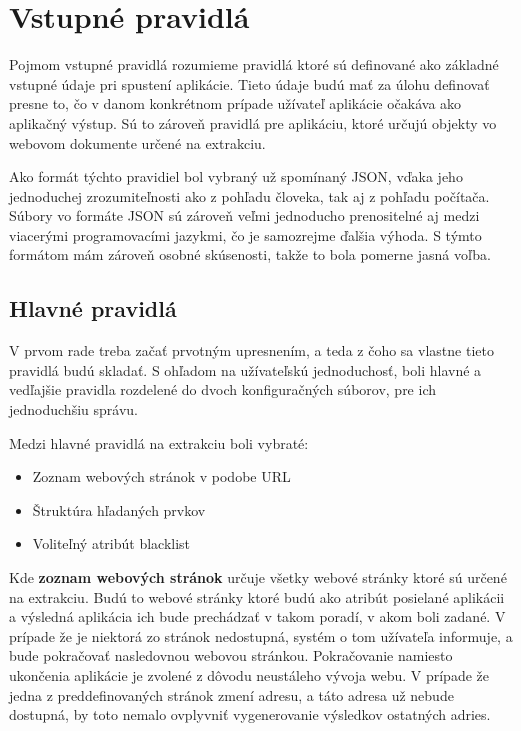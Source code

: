 \newpage
\section{Vstupné pravidlá}

Pojmom vstupné pravidlá rozumieme pravidlá ktoré sú definované ako základné vstupné údaje pri spustení aplikácie. Tieto údaje budú mať za úlohu definovať presne to, čo v danom konkrétnom prípade užívateľ aplikácie očakáva ako aplikačný výstup. Sú to zároveň pravidlá pre aplikáciu, ktoré určujú objekty vo webovom dokumente určené na extrakciu.

Ako formát týchto pravidiel bol vybraný už spomínaný JSON, vďaka jeho jednoduchej zrozumiteľnosti ako z pohľadu človeka, tak aj z pohľadu počítača. Súbory vo formáte JSON sú zároveň veľmi jednoducho prenositelné aj medzi viacerými programovacími jazykmi, čo je samozrejme ďalšia výhoda. S týmto formátom mám zároveň osobné skúsenosti, takže to bola pomerne jasná voľba.

\subsection{Hlavné pravidlá}

V prvom rade treba začať prvotným upresnením, a teda z čoho sa vlastne tieto pravidlá budú skladať. S ohľadom na užívateľskú jednoduchosť, boli hlavné a vedľajšie pravidla rozdelené do dvoch konfiguračných súborov, pre ich jednoduchšiu správu. 

Medzi hlavné pravidlá na extrakciu boli vybraté:
\begin{itemize}
    \item {Zoznam webových stránok v podobe URL}
    \item {Štruktúra hľadaných prvkov}
    \item {Voliteľný atribút blacklist}
\end{itemize}

\bigskip

Kde \textbf{zoznam webových stránok} určuje všetky webové stránky ktoré sú určené na extrakciu. Budú to webové stránky ktoré budú ako atribút posielané aplikácii a výsledná aplikácia ich bude prechádzať v takom poradí, v akom boli zadané. V prípade že je niektorá zo stránok nedostupná, systém o tom užívateľa informuje, a bude pokračovať nasledovnou webovou stránkou. Pokračovanie namiesto ukončenia aplikácie je zvolené z dôvodu neustáleho vývoja webu. V prípade že jedna z preddefinovaných stránok zmení adresu, a táto adresa už nebude dostupná, by toto nemalo ovplyvniť vygenerovanie výsledkov ostatných adries.

